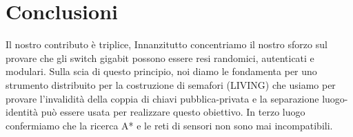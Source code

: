 \documentclass{article}
\begin{document}
\section{Conclusioni}
\label{S:Concl}

Il nostro contributo \`{e} triplice, Innanzitutto  concentriamo il nostro sforzo sul provare che gli switch gigabit possono essere resi randomici, autenticati e modulari. Sulla scia di questo principio, noi diamo le fondamenta per uno strumento distribuito per la costruzione di semafori (LIVING) che usiamo per provare l'invalidit\`{a} della coppia di chiavi pubblica-privata e la separazione luogo-identit\`{a} pu\`{o} essere usata per realizzare questo obiettivo. In terzo luogo confermiamo che la ricerca A* e le reti di sensori non sono mai incompatibili.
\end{document}
